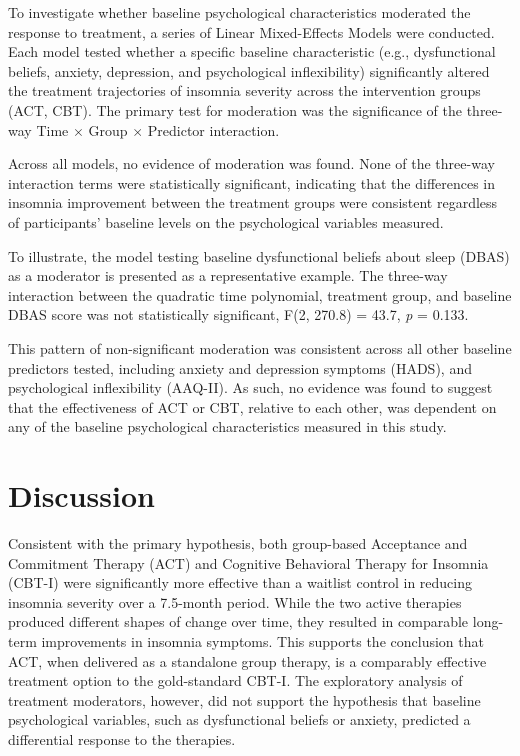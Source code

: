 \documentclass[
  english,
  man]{apa6}
\begin{document}
To investigate whether baseline psychological characteristics moderated the response to treatment, a series of Linear Mixed-Effects Models were conducted. Each model tested whether a specific baseline characteristic (e.g., dysfunctional beliefs, anxiety, depression, and psychological inflexibility) significantly altered the treatment trajectories of insomnia severity across the intervention groups (ACT, CBT). The primary test for moderation was the significance of the three-way Time \(\times\) Group \(\times\) Predictor interaction.

Across all models, no evidence of moderation was found. None of the three-way interaction terms were statistically significant, indicating that the differences in insomnia improvement between the treatment groups were consistent regardless of participants' baseline levels on the psychological variables measured.

To illustrate, the model testing baseline dysfunctional beliefs about sleep (DBAS) as a moderator is presented as a representative example. The three-way interaction between the quadratic time polynomial, treatment group, and baseline DBAS score was not statistically significant, F(2, 270.8) = 43.7, \emph{p} = 0.133.

This pattern of non-significant moderation was consistent across all other baseline predictors tested, including anxiety and depression symptoms (HADS), and psychological inflexibility (AAQ-II). As such, no evidence was found to suggest that the effectiveness of ACT or CBT, relative to each other, was dependent on any of the baseline psychological characteristics measured in this study.

\section{Discussion}\label{discussion}

Consistent with the primary hypothesis, both group-based Acceptance and Commitment Therapy (ACT) and Cognitive Behavioral Therapy for Insomnia (CBT-I) were significantly more effective than a waitlist control in reducing insomnia severity over a 7.5-month period. While the two active therapies produced different shapes of change over time, they resulted in comparable long-term improvements in insomnia symptoms. This supports the conclusion that ACT, when delivered as a standalone group therapy, is a comparably effective treatment option to the gold-standard CBT-I. The exploratory analysis of treatment moderators, however, did not support the hypothesis that baseline psychological variables, such as dysfunctional beliefs or anxiety, predicted a differential response to the therapies.
\end{document}
